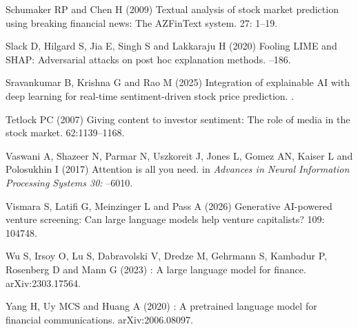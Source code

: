 \documentclass{aims}
\numberwithin{equation}{section}
\begin{document}
\begin{thebibliography}{}
\newblock Schumaker RP and Chen H (2009)
\newblock Textual analysis of stock market prediction using breaking financial
  news: The {AZFinText} system.
 27:
  1--19. 

\newblock Slack D, Hilgard S, Jia E, Singh S and Lakkaraju H (2020)
\newblock Fooling {LIME} and {SHAP}: Adversarial attacks on post hoc
  explanation methods.
--186. 

\newblock Sravankumar B, Krishna G and Rao M (2025)
\newblock Integration of explainable {AI} with deep learning for real-time
  sentiment-driven stock price prediction.
. 

\newblock Tetlock PC (2007)
\newblock Giving content to investor sentiment: The role of media in the stock
  market.
 62:1139--1168. 

\newblock Vaswani A, Shazeer N, Parmar N, Uszkoreit J, Jones L, 
  Gomez AN, Kaiser L and Polosukhin I (2017)
\newblock Attention is all you need.
\newblock in {\em Advances in Neural Information Processing Systems 30:}
--6010. 

\newblock Vismara S, Latifi G, Meinzinger L and Pass A (2026)
\newblock Generative {AI}-powered venture screening: Can large language models help
  venture capitalists?
 109:
  104748. 
  
\newblock Wu S, Irsoy O, Lu S, Dabravolski V, Dredze M, Gehrmann S, Kambadur P, Rosenberg D and Mann G (2023)
: A large language model for finance.
\newblock arXiv:2303.17564. 

\newblock Yang H, Uy MCS and Huang A (2020)
: A pretrained language model for financial communications.
\newblock arXiv:2006.08097. 
  

\end{thebibliography}
\end{document}
